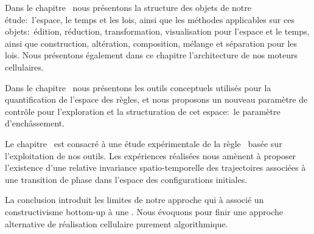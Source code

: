 \begin{small}
Dans le chapitre~ nous présentons la
structure des objets de notre étude:~l'espace, le temps et les lois, %
ainsi que les méthodes applicables sur ces objets:~édition, réduction,
transformation, visualisation pour l'espace et le temps, ainsi que
construction, altération, composition, mélange et séparation pour les
lois. %
Nous présentons également dans ce chapitre l'architecture de nos
moteurs cellulaires. %

Dans le chapitre~ nous présentons les outils
conceptuels utilisés pour la quantification de l'espace des règles, et
nous proposons un nouveau paramètre de contrôle pour l'exploration et
la structuration de cet espace:~le paramètre d'enchâssement. %

Le chapitre~ est consacré à une étude
expérimentale de la règle~ basée sur l'exploitation de nos outils. %
Les expériences réalisées nous amènent à proposer l'existence d'une
relative invariance spatio-temporelle des trajectoires associées à
une transition de phase dans l'espace des configurations initiales. %

La conclusion introduit les limites de notre approche qui à associé
un constructivisme bottom-up à une . %
Nous évoquons pour finir une approche alternative de réalisation
cellulaire purement algorithmique. %

\end{small}

